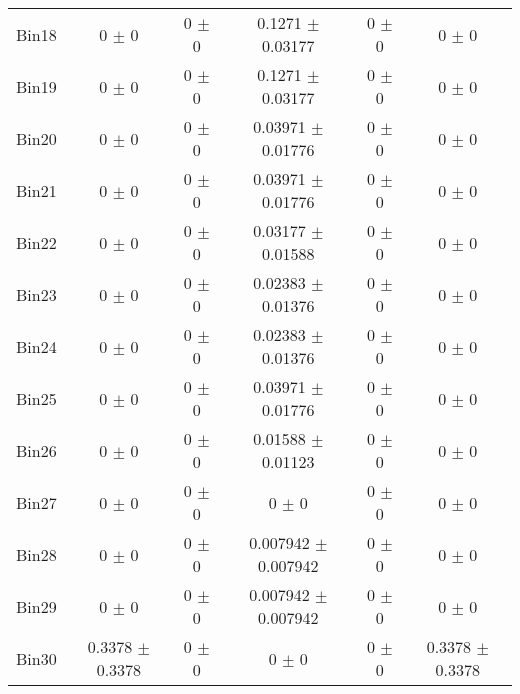 \begin{tabular}{@{\extracolsep{4pt}}lccccc@{}}
     Bin18 & 0 $\pm$ 0 & 0 $\pm$ 0 & 0.1271 $\pm$ 0.03177 & 0 $\pm$ 0 & 0 $\pm$ 0 \\ 
     Bin19 & 0 $\pm$ 0 & 0 $\pm$ 0 & 0.1271 $\pm$ 0.03177 & 0 $\pm$ 0 & 0 $\pm$ 0 \\ 
     Bin20 & 0 $\pm$ 0 & 0 $\pm$ 0 & 0.03971 $\pm$ 0.01776 & 0 $\pm$ 0 & 0 $\pm$ 0 \\ 
     Bin21 & 0 $\pm$ 0 & 0 $\pm$ 0 & 0.03971 $\pm$ 0.01776 & 0 $\pm$ 0 & 0 $\pm$ 0 \\ 
     Bin22 & 0 $\pm$ 0 & 0 $\pm$ 0 & 0.03177 $\pm$ 0.01588 & 0 $\pm$ 0 & 0 $\pm$ 0 \\ 
     Bin23 & 0 $\pm$ 0 & 0 $\pm$ 0 & 0.02383 $\pm$ 0.01376 & 0 $\pm$ 0 & 0 $\pm$ 0 \\ 
     Bin24 & 0 $\pm$ 0 & 0 $\pm$ 0 & 0.02383 $\pm$ 0.01376 & 0 $\pm$ 0 & 0 $\pm$ 0 \\ 
     Bin25 & 0 $\pm$ 0 & 0 $\pm$ 0 & 0.03971 $\pm$ 0.01776 & 0 $\pm$ 0 & 0 $\pm$ 0 \\ 
     Bin26 & 0 $\pm$ 0 & 0 $\pm$ 0 & 0.01588 $\pm$ 0.01123 & 0 $\pm$ 0 & 0 $\pm$ 0 \\ 
     Bin27 & 0 $\pm$ 0 & 0 $\pm$ 0 & 0 $\pm$ 0 & 0 $\pm$ 0 & 0 $\pm$ 0 \\ 
     Bin28 & 0 $\pm$ 0 & 0 $\pm$ 0 & 0.007942 $\pm$ 0.007942 & 0 $\pm$ 0 & 0 $\pm$ 0 \\ 
     Bin29 & 0 $\pm$ 0 & 0 $\pm$ 0 & 0.007942 $\pm$ 0.007942 & 0 $\pm$ 0 & 0 $\pm$ 0 \\ 
     Bin30 & 0.3378 $\pm$ 0.3378 & 0 $\pm$ 0 & 0 $\pm$ 0 & 0 $\pm$ 0 & 0.3378 $\pm$ 0.3378 \\ 
\hline\hline
  \end{tabular}
